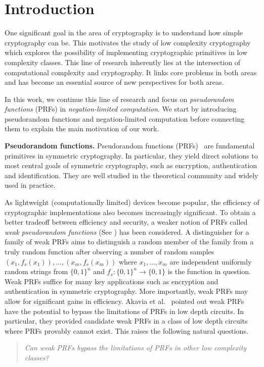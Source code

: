 \documentclass{toc}
\begin{document}
%
%
%
\section{Introduction}

One significant goal in the area of cryptography is to understand how simple cryptography can be.  This motivates the study of low complexity cryptography which explores the possibility of implementing cryptographic primitives in low complexity classes. This line of research inherently lies at the intersection of computational complexity and cryptography. It links core problems in both areas and has become an essential source of new perspectives for both areas.

In this work, we continue this line of research and focus on \emph{pseudorandom functions} (PRFs) in \emph{negation-limited computation}. We start by introducing pseudorandom functions and negation-limited computation before connecting them to explain the main motivation of our work.

\vspace{2ex}
\noindent\textbf{Pseudorandom functions.} Pseudorandom functions (PRFs)~\cite{GGM} are fundamental primitives in symmetric cryptography. In particular, they yield direct solutions to most central goals of symmetric cryptography, such as encryption, authentication and identification. They are well studied in the theoretical community and widely used in practice.

As lightweight (computationally limited) devices become popular, the efficiency of cryptographic implementations
also %
becomes %
increasingly significant.  To obtain a better tradeoff between efficiency and security, a weaker notion of PRFs called \emph{weak pseudorandom functions} (See ) has been considered. A distinguisher for a 
family of %
weak PRFs aims to distinguish a random member of the family from a truly random function after observing a number of random samples $(x_1,f_s(x_1)),\dots, (x_m,f_s(x_m))$ where $x_1,\dots,x_m$ are independent uniformly random strings from $\{0,1\}^n$ and $f_s:\{0,1\}^n\rightarrow\{0,1\}$ is the function in question. Weak PRFs suffice for many key applications such as encryption and authentication in symmetric cryptography. More importantly, weak PRFs may allow for significant gains in efficiency.  Akavia et al.~\cite{ABGKM14} pointed out weak PRFs have the potential to bypass the limitations of PRFs in low depth circuits. In particular, they provided candidate weak PRFs in a class of low depth circuits where PRFs provably cannot exist. This raises the following natural questions.
\begin{quote} {\it
Can weak PRFs bypass the limitations of PRFs in other low complexity classes? }
\end{quote}
\end{document}
